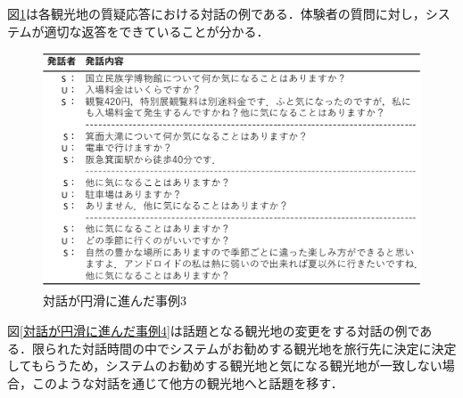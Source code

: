 図\ref{対話が円滑に進んだ事例3}は各観光地の質疑応答における対話の例である．体験者の質問に対し，システムが適切な返答をできていることが分かる．

\begin{figure}[th]
    \centering
    \includegraphics[scale=0.5]{pic/example03.pdf}
    \caption{対話が円滑に進んだ事例3}
    \label{対話が円滑に進んだ事例3}
\end{figure}

図\ref{対話が円滑に進んだ事例4}は話題となる観光地の変更をする対話の例である．限られた対話時間の中でシステムがお勧めする観光地を旅行先に決定に決定してもらうため，システムのお勧めする観光地と気になる観光地が一致しない場合，このような対話を通じて他方の観光地へと話題を移す．

